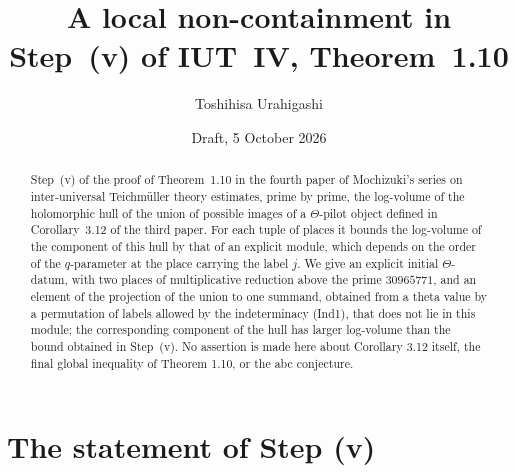 \documentclass[11pt]{amsart}
\theoremstyle{remark}
\begin{document}
\title{A local non-containment in Step~(v) of IUT~IV, Theorem~1.10}
\author{Toshihisa Urahigashi}
\date{Draft, 5 October 2026}

\begin{abstract}
Step~(v) of the proof of Theorem~1.10 in the fourth paper of Mochizuki's series on inter-universal
Teichm\"uller theory estimates, prime by prime, the log-volume of the holomorphic hull of the union of
possible images of a $\Theta$-pilot object defined in Corollary~3.12 of the third paper. For each tuple of
places it bounds the log-volume of the component of this hull by that of an explicit module, which depends on the
order of the $q$-parameter at the place carrying the label $j$. We give an explicit initial $\Theta$-datum, with
two places of multiplicative reduction above the prime $30965771$, and an element of the projection of the union
to one summand, obtained from a theta value by a permutation of labels allowed by the indeterminacy (Ind1), that
does not lie in this module; the corresponding component of the hull has larger log-volume than the bound obtained
in Step~(v).  No assertion is made here about Corollary 3.12 itself, the final global inequality of Theorem 1.10, or the
abc conjecture.
\end{abstract}

\maketitle

\section{The statement of Step (v)}\label{s:source}
\end{document}
